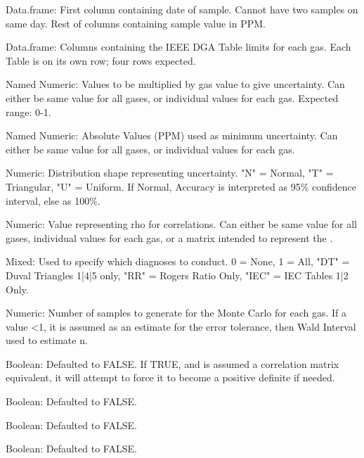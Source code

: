 \documentclass[a4paper]{book}
\begin{document}
\begin{Arguments}
\begin{ldescription}
\item[\code{gas\_data}] Data.frame: First column containing date of sample. Cannot have two samples on same day. Rest of columns containing sample value in PPM.

\item[\code{limit\_data}] Data.frame: Columns containing the IEEE DGA Table limits for each gas. Each Table is on its own row; four rows expected.

\item[\code{accuracy}] Named Numeric: Values to be multiplied by gas value to give uncertainty. Can either be same value for all gases, or individual values for each gas. Expected range: 0-1.

\item[\code{min\_accuracy}] Named Numeric: Absolute Values (PPM) used as minimum uncertainty. Can either be same value for all gases, or individual values for each gas.

\item[\code{distribution\_shape}] Numeric: Distribution shape representing uncertainty. "N" = Normal, "T" = Triangular, "U" = Uniform. If Normal, Accuracy is interpreted as 95\% confidence interval, else as 100\%.

\item[\code{rho}] Numeric: Value representing rho for correlations. Can either be same value for all gases, individual values for each gas, or a matrix intended to represent the .

\item[\code{diagnosis}] Mixed: Used to specify which diagnoses to conduct. 0 = None, 1 = All, "DT" = Duval Triangles 1|4|5 only, "RR" = Rogers Ratio Only, "IEC" = IEC Tables 1|2 Only.

\item[\code{n}] Numeric: Number of samples to generate for the Monte Carlo for each gas. If a value <1, it is assumed as an estimate for the error tolerance, then Wald Interval used to estimate n.

\item[\code{flex}] Boolean: Defaulted to FALSE. If TRUE, and  is assumed a correlation matrix equivalent, it will attempt to force it to become a positive definite if needed.

\item[\code{silent}] Boolean: Defaulted to FALSE.

\item[\code{verbose}] Boolean: Defaulted to FALSE.

\item[\code{validate}] Boolean: Defaulted to FALSE.
\end{ldescription}
\end{Arguments}
\end{document}
